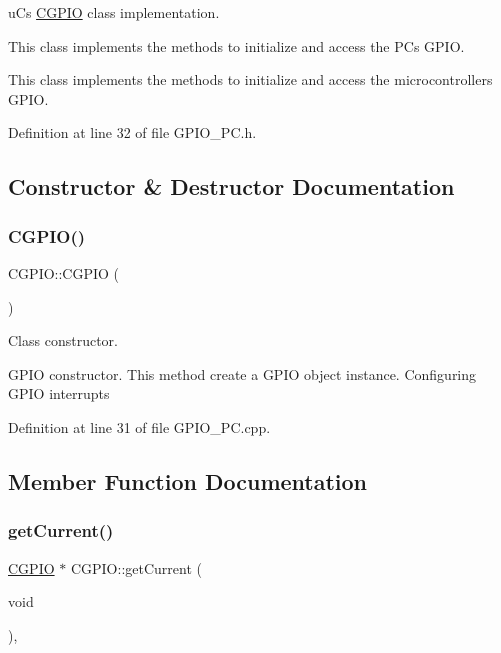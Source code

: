 uC\textquotesingle{}s \mbox{\hyperlink{class_c_g_p_i_o}{C\+G\+P\+IO}} class implementation.

This class implements the methods to initialize and access the PC\textquotesingle{}s G\+P\+IO.

This class implements the methods to initialize and access the microcontroller\textquotesingle{}s G\+P\+IO. 

Definition at line 32 of file G\+P\+I\+O\+\_\+\+P\+C.\+h.



\subsection{Constructor \& Destructor Documentation}
\mbox{\label{class_c_g_p_i_o_a9d4e47555fcac0233f6f3ebe36153863}} 
\subsubsection{\texorpdfstring{C\+G\+P\+I\+O()}{CGPIO()}}
{\footnotesize\ttfamily C\+G\+P\+I\+O\+::\+C\+G\+P\+IO (\begin{DoxyParamCaption}{ }\end{DoxyParamCaption})}



Class constructor. 

G\+P\+IO constructor. This method create a G\+P\+IO object instance. Configuring G\+P\+IO interrupts 

Definition at line 31 of file G\+P\+I\+O\+\_\+\+P\+C.\+cpp.



\subsection{Member Function Documentation}
\mbox{\label{class_c_g_p_i_o_a5fda50ad2bf1efc087793542ee3c88af}} 
\subsubsection{\texorpdfstring{get\+Current()}{getCurrent()}}
{\footnotesize\ttfamily \mbox{\hyperlink{class_c_g_p_i_o}{C\+G\+P\+IO}} $\ast$ C\+G\+P\+I\+O\+::get\+Current (\begin{DoxyParamCaption}\item[{void}]{ }\end{DoxyParamCaption})\hspace{0.3cm}{\ttfamily [static]}, {\ttfamily [protected]}}



